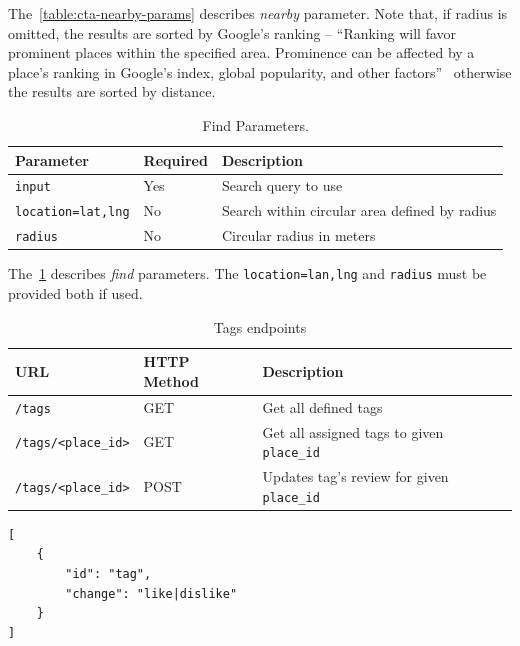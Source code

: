 The~\cref{table:cta-nearby-params} describes \textit{nearby} parameter. Note that, if radius is omitted, the results are sorted by Google's ranking -- ``Ranking will favor prominent places within the specified area. Prominence can be affected by a place's ranking in Google's index, global popularity, and other factors''~\cite{google-places-api-nearby-req} otherwise the results are sorted by distance. 
\begin{table}[ht]
\centering
\begin{tabularx}{\textwidth}{|l|l|X|}
\hline
\textbf{Parameter} & \textbf{Required} & \textbf{Description} \\ \hline
\verb|input| & Yes & Search query to use \\ \hline
\verb|location=lat,lng| & No & Search within circular area defined by radius \\ \hline
\verb|radius| & No & Circular radius in meters\\ \hline
\end{tabularx}
\caption{Find Parameters.}
\label{table:cta-find-params}
\end{table}

The~\cref{table:cta-find-params} describes \textit{find} parameters. The \verb|location=lan,lng| and \verb|radius| must be provided both if used. 
\begin{table}[ht]
\centering
\begin{tabularx}{\textwidth}{|l|l|X|}
\hline
\textbf{URL} & \textbf{HTTP Method} & \textbf{Description} \\ \hline
\verb|/tags| & GET & Get all defined tags \\ \hline
\verb|/tags/<place_id>| & GET & Get all assigned tags to given \verb|place_id| \\ \hline
\verb|/tags/<place_id>| & POST & Updates tag's review for given \verb|place_id| \\ \hline
\end{tabularx}
\caption{Tags endpoints}
\label{table:cta-tags}
\end{table}

\begin{listing}[ht]
\begin{verbatim}
[
    {
        "id": "tag",
        "change": "like|dislike"
    }
]
\end{verbatim}
\caption{Tag Update Content Example.}
\label{listing:tag-update-post}
\end{listing}

